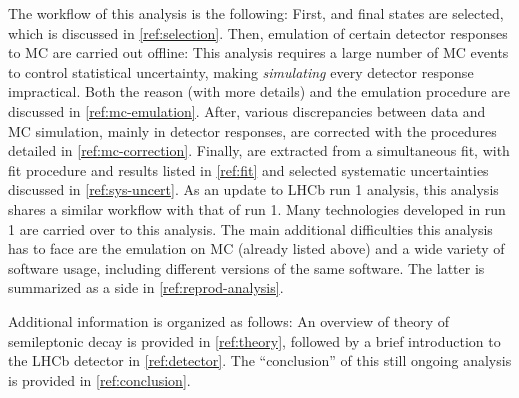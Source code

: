 
The workflow of this analysis is the following:
First, \Dstarp\mun and \Dz\mun final states are selected, which is discussed
in \cref{ref:selection}.
Then, emulation of certain detector responses to MC are carried out offline:
This analysis requires a large number of MC events to control statistical
uncertainty, making \emph{simulating} every detector response impractical.
Both the reason (with more details) and the emulation procedure are discussed in
\cref{ref:mc-emulation}.
After, various discrepancies between data and MC simulation,
mainly in detector responses, are corrected with the procedures detailed
in \cref{ref:mc-correction}.
Finally, \RDX are extracted from a simultaneous fit, with fit procedure and
results listed in \cref{ref:fit}
and selected systematic uncertainties discussed in
\cref{ref:sys-uncert}.
As an update to LHCb \RDX run 1 analysis, this analysis shares a similar
workflow with that of run 1.
Many technologies developed in run 1 are carried over to this analysis.
The main additional difficulties this analysis has to face are the emulation
on MC (already listed above) and a wide variety of software usage, including
different versions of the same software.
The latter is summarized as a side in \cref{ref:reprod-analysis}.

Additional information is organized as follows:
An overview of theory of semileptonic \B decay is provided in
\cref{ref:theory},
followed by a brief introduction to the LHCb detector in \cref{ref:detector}.
The ``conclusion'' of this still ongoing analysis is provided in
\cref{ref:conclusion}.
